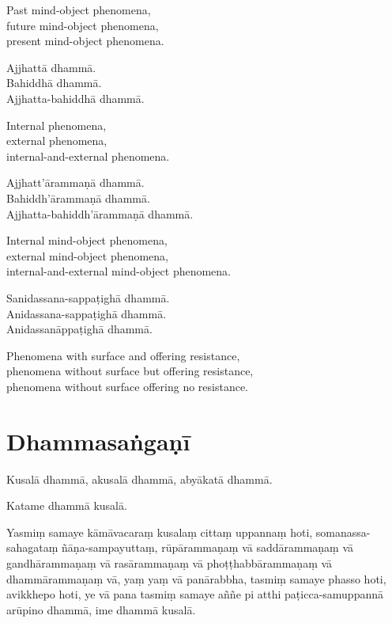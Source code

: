 \begin{english}
  Past mind-object phenomena,\\
  future mind-object phenomena,\\
  present mind-object phenomena.
\end{english}

Ajjhattā dhammā.\\
Bahiddhā dhammā.\\
Ajjhatta-bahiddhā dhammā.

\begin{english}
  Internal phenomena,\\
  external phenomena,\\
  internal-and-external phenomena.
\end{english}

Ajjhatt'ārammaṇā dhammā.\\
Bahiddh'ārammaṇā dhammā.\\
Ajjhatta-bahiddh'ārammaṇā dhammā.

\begin{english}
  Internal mind-object phenomena,\\
  external mind-object phenomena,\\
  internal-and-external mind-object phenomena.
\end{english}

Sanidassana-sappaṭighā dhammā.\\
Anidassana-sappaṭighā dhammā.\\
Anidassanāppaṭighā dhammā.

\begin{english}
  Phenomena with surface and offering resistance,\\
  phenomena without surface but offering resistance,\\
  phenomena without surface offering no resistance.
\end{english}


\section{Dhammasaṅgaṇī}

Kusalā dhammā, akusalā dhammā, abyākatā dhammā.

Katame dhammā kusalā.

Yasmiṃ samaye kāmāvacaraṃ kusalaṃ cittaṃ uppannaṃ hoti, somanassa-sahagataṃ
ñāṇa-sampayuttaṃ, rūpārammaṇaṃ vā saddārammaṇaṃ vā gandhārammaṇaṃ vā
rasārammaṇaṃ vā phoṭṭhabbārammaṇaṃ vā dhammārammaṇaṃ vā, yaṃ yaṃ vā panārabbha,
tasmiṃ samaye phasso hoti, avikkhepo hoti, ye vā pana tasmiṃ samaye aññe pi atthi paṭicca-samuppannā arūpino dhammā, ime dhammā kusalā.

